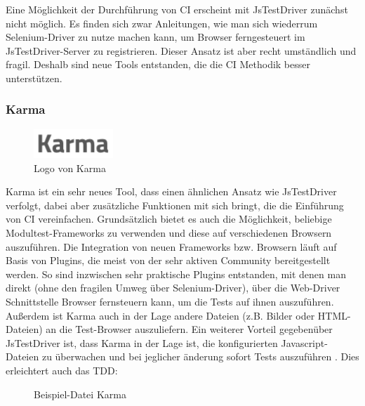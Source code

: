Eine Möglichkeit der Durchführung von \ac{CI} erscheint mit JsTestDriver zunächst nicht möglich. Es finden sich zwar Anleitungen, wie man sich wiederrum Selenium-Driver zu nutze machen kann, um Browser ferngesteuert im JsTestDriver-Server zu registrieren. Dieser Ansatz ist aber recht umständlich und fragil. Deshalb sind neue Tools entstanden, die die \ac{CI} Methodik besser unterstützen.

\subsubsection{Karma}

\begin{figure}[H]
	\begin{center}
		\includegraphics[width=3cm]{bilder/karma}
		\caption{Logo von Karma}
		\label{image:karma}
	\end{center}
\end{figure}

Karma ist ein sehr neues Tool, dass einen ähnlichen Ansatz wie JsTestDriver verfolgt, dabei aber zusätzliche Funktionen mit sich bringt, die die Einführung von \ac{CI} vereinfachen. Grundsätzlich bietet es auch die Möglichkeit, beliebige Modultest-Frameworks zu verwenden und diese auf verschiedenen Browsern auszuführen. Die Integration von neuen Frameworks bzw. Browsern läuft auf Basis von Plugins, die meist von der sehr aktiven Community bereitgestellt werden. So sind inzwischen sehr praktische Plugins entstanden, mit denen man direkt (ohne den fragilen Umweg über Selenium-Driver), über die Web-Driver Schnittstelle Browser fernsteuern kann, um die Tests auf ihnen auszuführen. Außerdem ist Karma auch in der Lage andere Dateien (z.B. Bilder oder HTML-Dateien) an die Test-Browser auszuliefern. Ein weiterer Vorteil gegebenüber JsTestDriver ist, dass Karma in der Lage ist, die konfigurierten Javascript-Dateien zu überwachen und bei jeglicher änderung sofort Tests auszuführen \citep[Vgl][]{Google13-01}. Dies erleichtert auch das \ac{TDD}:

\begin{figure}[H]
	\begin{center}
		\caption{Beispiel-Datei Karma}
		\label{code:karma}
	\end{center}
\end{figure}

